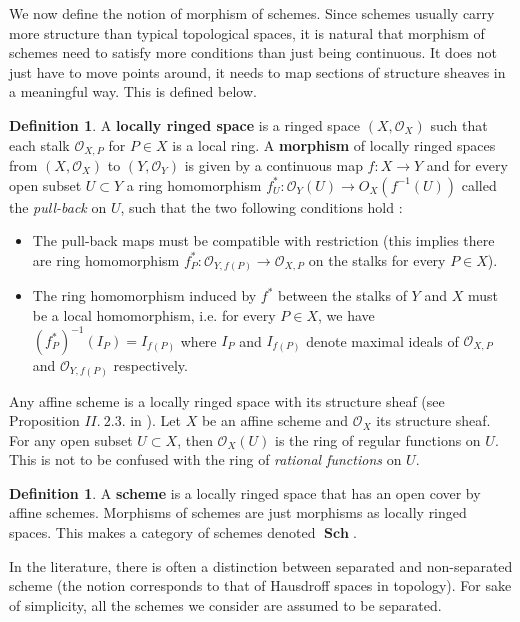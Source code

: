 \documentclass{article}
\theoremstyle{plain}
\theoremstyle{definition}
\newtheorem{definition}[theorem]{Definition}
\DeclareMathOperator{\Sch}{\textbf{Sch}}
\begin{document}
\noindent We now define the notion of morphism of schemes. 
Since schemes usually carry more structure than typical topological spaces, it is natural that morphism of schemes need to satisfy more conditions than just being continuous. 
It does not just have to move points around, it needs to map sections of structure sheaves in a meaningful way. 
This is defined below.

\begin{definition}
    A \textbf{locally ringed space} is a ringed space $(X,\mathcal{O}_X)$ such that each stalk $\mathcal{O}_{X,P}$ for $P\in X$ is a local ring.
    A \textbf{morphism} of locally ringed spaces from $(X,\mathcal{O}_X)$ to $(Y,\mathcal{O}_Y)$ is given by a continuous map $f:X\rightarrow Y$ and for every open subset $U\subset Y$ a ring homomorphism $f^*_U:\mathcal{O}_Y(U)\rightarrow O_X(f^{-1}(U))$ called the \textit{pull-back} on $U$, such that the two following conditions hold :
    \begin{itemize}
        \item[$a)$] The pull-back maps must be compatible with restriction (this implies there are ring homomorphism $f^*_P:\mathcal{O}_{Y,f(P)}\rightarrow \mathcal{O}_{X,P}$ on the stalks for every $P\in X$).
        \item[$b)$] The ring homomorphism induced by $f^*$ between the stalks of $Y$ and $X$ must be a local homomorphism, i.e.
        for every $P\in X$, we have $(f^*_P)^{-1}(I_P) = I_{f(P)}$ where $I_P$ and $I_{f(P)}$ denote maximal ideals of $\mathcal{O}_{X,P}$ and $\mathcal{O}_{Y,f(P)}$ respectively.
    \end{itemize}
\end{definition}

\noindent Any affine scheme is a locally ringed space with its structure sheaf (see Proposition $II. \:2.3.$ in \cite{Hartshorne}).
Let $X$ be an affine scheme and $\mathcal{O}_X$ its structure sheaf.
For any open subset $U\subset X$, then $\mathcal{O}_X(U)$ is the ring of regular functions on $U$. This is not to be confused with the ring of \textit{rational functions} on $U$.



\begin{definition}
    A \textbf{scheme} is a locally ringed space that has an open cover by affine schemes. Morphisms of schemes are just morphisms as locally ringed spaces. This makes a category of schemes denoted $\Sch$.
\end{definition}

\noindent In the literature, there is often a distinction between separated and non-separated scheme (the notion corresponds to that of Hausdroff spaces in topology). For sake of simplicity, all the schemes we consider are assumed to be separated.
\end{document}
